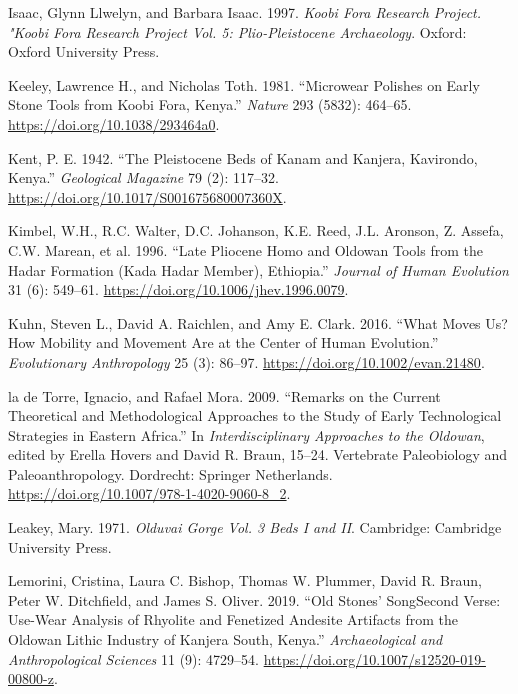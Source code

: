 \documentclass[]{elsarticle} %
\begin{document}
\leavevmode\hypertarget{ref-isaacKoobiForaResearch1997}{}%
Isaac, Glynn Llwelyn, and Barbara Isaac. 1997. \emph{Koobi Fora Research
Project. "Koobi Fora Research Project Vol. 5: Plio-Pleistocene
Archaeology}. Oxford: Oxford University Press.

\leavevmode\hypertarget{ref-keeleyMicrowearPolishesEarly1981}{}%
Keeley, Lawrence H., and Nicholas Toth. 1981. ``Microwear Polishes on
Early Stone Tools from Koobi Fora, Kenya.'' \emph{Nature} 293 (5832):
464--65. \url{https://doi.org/10.1038/293464a0}.

\leavevmode\hypertarget{ref-kentPleistoceneBedsKanam1942a}{}%
Kent, P. E. 1942. ``The Pleistocene Beds of Kanam and Kanjera,
Kavirondo, Kenya.'' \emph{Geological Magazine} 79 (2): 117--32.
\url{https://doi.org/10.1017/S001675680007360X}.

\leavevmode\hypertarget{ref-kimbelLatePlioceneHomo1996}{}%
Kimbel, W.H., R.C. Walter, D.C. Johanson, K.E. Reed, J.L. Aronson, Z.
Assefa, C.W. Marean, et al. 1996. ``Late Pliocene Homo and Oldowan Tools
from the Hadar Formation (Kada Hadar Member), Ethiopia.'' \emph{Journal
of Human Evolution} 31 (6): 549--61.
\url{https://doi.org/10.1006/jhev.1996.0079}.

\leavevmode\hypertarget{ref-kuhnWhatMovesUs2016}{}%
Kuhn, Steven L., David A. Raichlen, and Amy E. Clark. 2016. ``What Moves
Us? How Mobility and Movement Are at the Center of Human Evolution.''
\emph{Evolutionary Anthropology} 25 (3): 86--97.
\url{https://doi.org/10.1002/evan.21480}.

\leavevmode\hypertarget{ref-detorreRemarksCurrentTheoretical2009}{}%
la de Torre, Ignacio, and Rafael Mora. 2009. ``Remarks on the Current
Theoretical and Methodological Approaches to the Study of Early
Technological Strategies in Eastern Africa.'' In \emph{Interdisciplinary
Approaches to the Oldowan}, edited by Erella Hovers and David R. Braun,
15--24. Vertebrate Paleobiology and Paleoanthropology. Dordrecht:
Springer Netherlands. \url{https://doi.org/10.1007/978-1-4020-9060-8_2}.

\leavevmode\hypertarget{ref-leakeyOlduvaiGorgeVol1971}{}%
Leakey, Mary. 1971. \emph{Olduvai Gorge Vol. 3 Beds I and II}.
Cambridge: Cambridge University Press.

\leavevmode\hypertarget{ref-lemoriniOldStonesSong2019}{}%
Lemorini, Cristina, Laura C. Bishop, Thomas W. Plummer, David R. Braun,
Peter W. Ditchfield, and James S. Oliver. 2019. ``Old Stones' SongSecond
Verse: Use-Wear Analysis of Rhyolite and Fenetized Andesite Artifacts
from the Oldowan Lithic Industry of Kanjera South, Kenya.''
\emph{Archaeological and Anthropological Sciences} 11 (9): 4729--54.
\url{https://doi.org/10.1007/s12520-019-00800-z}.
\end{document}
